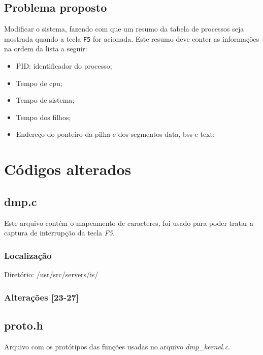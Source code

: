 \documentclass[12pt,a4paper]{article}
\begin{document}
\subsection{Problema proposto}

   Modificar o sistema, fazendo com que um resumo da tabela de processos seja mostrada quando a tecla \verb+F5+ for acionada. Este resumo deve conter as informações na ordem da lista a seguir:

\begin{itemize}
\item PID: identificador do processo;
\item Tempo de cpu;
\item Tempo de sistema;
\item Tempo dos filhos;
\item Endereço do ponteiro da pilha e dos segmentos data, bss e text;
\end{itemize}

\section{Códigos alterados}

\subsection{dmp.c}

   Este arquivo contém o mapeamento de caracteres, foi usado para poder tratar a captura de interrupção da tecla \emph{F5}.

\subsubsection{Localização}

   Diretório: /usr/src/servers/is/

\subsubsection{Alterações [23-27]}
   
   

\subsection{proto.h}

   Arquivo com os protótipos das funções usadas no arquivo \emph{dmp\_kernel.c}.
\end{document}
